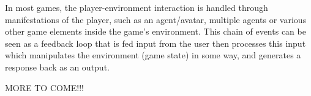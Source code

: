 In most games, the player-environment interaction is handled through manifestations of the player, such as an agent/avatar, multiple agents or various other game elements inside the game's environment. This chain of events can be seen as a feedback loop that is fed input from the user then processes this input which manipulates the environment (game state) in some way, and generates a response back as an output.

MORE TO COME!!!
 
